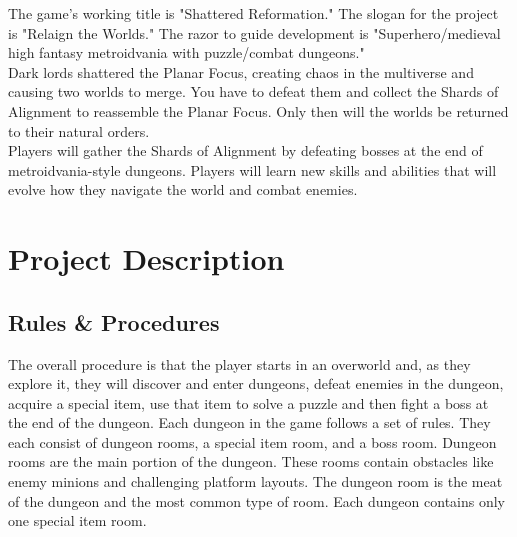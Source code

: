 \documentclass[titlepage]{article}
\begin{document}
%

The game's working title is "Shattered Reformation." The slogan for the project
is "Relaign the Worlds." The razor to guide development is "Superhero/medieval
high fantasy metroidvania with puzzle/combat dungeons." \\

Dark lords shattered the Planar Focus, creating chaos in the multiverse and
causing two worlds to merge. You have to defeat them and collect the Shards of
Alignment to reassemble the Planar Focus. Only then will the worlds be returned
to their natural orders. \\

Players will gather the Shards of Alignment by defeating bosses at the end of
metroidvania-style dungeons. Players will learn new skills and abilities that
will evolve how they navigate the world and combat enemies. 

\section{Project Description}

\subsection{Rules \& Procedures}

The overall procedure is that the player starts in an overworld and, as they explore 
it, they will discover and enter dungeons, defeat enemies in the dungeon, acquire a 
special item, use that item to solve a puzzle and then fight a boss at the end of the 
dungeon. Each dungeon in the game follows a set of rules. They each consist of 
dungeon rooms, a special item room, and a boss room. Dungeon rooms are the main 
portion of the dungeon. These rooms contain obstacles like enemy minions and challenging 
platform layouts. The dungeon room is the meat of the dungeon and the most common 
type of room. Each dungeon contains only one special item room. 
\end{document}
